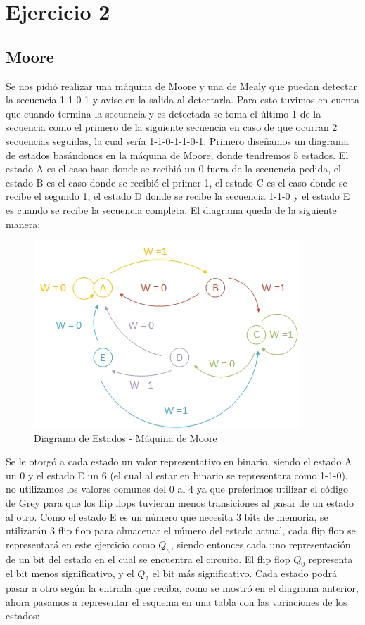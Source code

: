 \documentclass[10pt,a4paper]{article}
\begin{document}
\section{Ejercicio 2}

\subsection{Moore}
Se nos pidi\'o realizar una m\'aquina de Moore y una de Mealy que puedan detectar la secuencia 1-1-0-1 y avise en la salida al detectarla. Para esto tuvimos en cuenta que cuando termina la secuencia y es detectada se toma el \'ultimo 1 de la secuencia como el primero de la siguiente secuencia en caso de que ocurran 2 secuencias seguidas, la cual ser\'ia 1-1-0-1-1-0-1. Primero diseñamos un diagrama de estados basándonos en la m\'aquina de Moore, donde tendremos 5 estados. El estado A es el caso base donde se recibió un 0 fuera de la secuencia pedida, el estado B es el caso donde se recibió el primer 1, el estado C es el caso donde se recibe el segundo 1, el estado D donde se recibe la secuencia 1-1-0 y el estado E es cuando se recibe la secuencia completa. 
El diagrama queda de la siguiente manera:

\begin{figure}[hbtp]
	\centering
		\includegraphics[scale=1]{Imagenes/diagestmoore.jpg}
	\caption{Diagrama de Estados - Máquina de Moore}
	\label{2_fig0}
\end{figure}

Se le otorgó a cada estado un valor representativo en binario, siendo el estado A un 0 y el estado E un 6 (el cual al estar en binario se representara como 1-1-0), no utilizamos los valores comunes del 0 al 4 ya que preferimos utilizar el código de Grey para que los flip flops tuvieran menos transiciones al pasar de un estado al otro. Como el estado E es un número que necesita 3 bits de memoria, se utilizar\'an 3 flip flop para almacenar el número del estado actual, cada flip flop se representar\'a en este ejercicio como $Q_n$, siendo entonces cada uno representación de un bit del estado en el cual se encuentra el circuito. El flip flop $Q_0$ representa el bit menos significativo, y el $Q_2$ el bit más significativo. Cada estado podr\'a pasar a otro seg\'un la entrada que reciba, como se mostró en el diagrama anterior, ahora pasamos a representar el esquema en una tabla con las variaciones de los estados:
\end{document}
